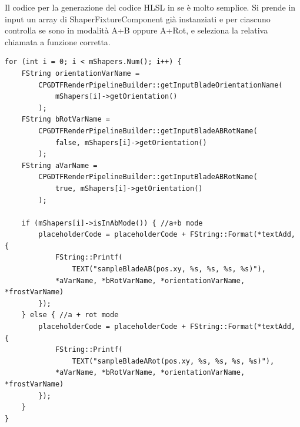 \documentclass[main.tex]{subfiles}
\begin{document}
Il codice per la generazione del codice HLSL in se è molto semplice. Si prende in input un array di ShaperFixtureComponent già instanziati e per ciascuno controlla se sono in modalità A+B oppure A+Rot, e seleziona la relativa chiamata a funzione corretta.
\lstset{language=UEcpp}
\begin{lstlisting}
for (int i = 0; i < mShapers.Num(); i++) {
    FString orientationVarName =
        CPGDTFRenderPipelineBuilder::getInputBladeOrientationName(
            mShapers[i]->getOrientation()
        );
    FString bRotVarName =
        CPGDTFRenderPipelineBuilder::getInputBladeABRotName(
            false, mShapers[i]->getOrientation()
        );
    FString aVarName =
        CPGDTFRenderPipelineBuilder::getInputBladeABRotName(
            true, mShapers[i]->getOrientation()
        );

    if (mShapers[i]->isInAbMode()) { //a+b mode
        placeholderCode = placeholderCode + FString::Format(*textAdd, {
            FString::Printf(
                TEXT("sampleBladeAB(pos.xy, %s, %s, %s, %s)"),
            *aVarName, *bRotVarName, *orientationVarName, *frostVarName)
        });
    } else { //a + rot mode
        placeholderCode = placeholderCode + FString::Format(*textAdd, {
            FString::Printf(
                TEXT("sampleBladeARot(pos.xy, %s, %s, %s, %s)"),
            *aVarName, *bRotVarName, *orientationVarName, *frostVarName)
        });
    }
}
\end{lstlisting}
\end{document}
